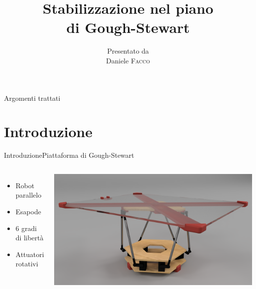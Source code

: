 \documentclass[10pt,aspectratio=169
	]{beamer}
\title[Stabilizzazione nel piano di Gough-Stewart] %
	{\huge Stabilizzazione nel piano\\ di Gough-Stewart} %
\author[Daniele Facco]%
	{%
		{\footnotesize Presentato da}\\
		Daniele \textsc{Facco}%
	}
\institute[
		Dipartimento di ingegneria e architettura\\
		Università degli Studi di Trieste\\
		Italia
	]
	{%
		Università degli Studi di Trieste
	}
\begin{document}
	\maketitle

	\begin{frame}{Argomenti trattati}{}
		\tableofcontents
	\end{frame}

	\section{Introduzione}
	\begin{frame}{Introduzione}{Piattaforma di Gough-Stewart}

	\begin{columns}
	
	\begin{itemize}
		\item Robot parallelo
		\item Esapode
		\item 6 gradi di libertà
		\item Attuatori rotativi
	\end{itemize}
	\centering \includegraphics[width=\textwidth]{./images/stewart.png}
	\end{columns}
	\end{frame}
	
\end{document}

